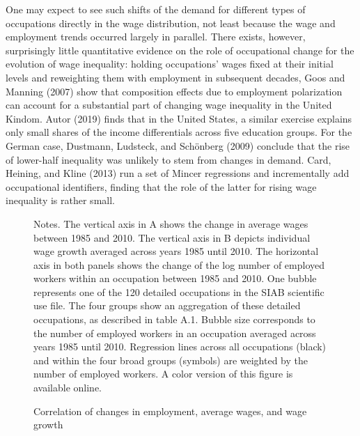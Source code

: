 \documentclass[12pt]{article}
\theoremstyle{definition}
\begin{document}
One may expect to see such shifts of the demand for different types of occupations directly in the wage distribution, not least because the wage and employment trends occurred largely in parallel. There exists, however, surprisingly little quantitative evidence on the role of occupational change for the evolution of wage inequality: holding occupations' wages fixed at their initial levels and reweighting them with employment in subsequent decades, Goos and Manning (2007) show that composition effects due to employment polarization can account for a substantial part of changing wage inequality in the United Kindom. Autor (2019) finds that in the United States, a similar exercise explains only small shares of the income differentials across five education groups. For the German case, Dustmann, Ludsteck, and Schönberg (2009) conclude that the rise of lower-half inequality was unlikely to stem from changes in demand. Card, Heining, and Kline (2013) run a set of Mincer regressions and incrementally add occupational identifiers, finding that the role of the latter for rising wage inequality is rather small.

\begin{figure}[H]
    \noindent\caption{Correlation of changes in employment, average wages, and wage growth}
    \begin{center}
        \label{bohmOccupationGrowthSkill2024_fig2}
    \end{center}
    \vspace{-20pt}
    {\footnotesize Notes. The vertical axis in A shows the change in average wages between 1985 and 2010. The vertical axis in B depicts individual wage growth averaged across years 1985 until 2010. The horizontal axis in both panels shows the change of the log number of employed workers within an occupation between 1985 and 2010. One bubble represents one of the 120 detailed occupations in the SIAB scientific use file. The four groups show an aggregation of these detailed occupations, as described in table A.1. Bubble size corresponds to the number of employed workers in an occupation averaged across years 1985 until 2010. Regression lines across all occupations (black) and within the four broad groups (symbols) are weighted by the number of employed workers. A color version of this figure is available online.}
\end{figure}
\end{document}
